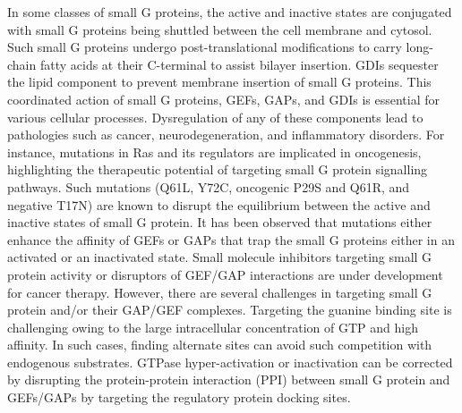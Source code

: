 \documentclass[12pt,a4paper]{achemso}
\begin{document}
In some classes of small G proteins, the active and inactive states are conjugated with small G proteins being shuttled between the cell membrane and cytosol. Such small G proteins undergo post-translational modifications to carry long-chain fatty acids at their C-terminal to assist bilayer insertion. GDIs\cite{dermardirossian2005gdis, maruta1998gtpase} sequester the lipid component to prevent membrane insertion of small G proteins. This coordinated action of small G proteins, GEFs, GAPs, and GDIs is essential for various cellular processes. Dysregulation of any of these components lead to pathologies such as cancer, neurodegeneration, and inflammatory disorders. For instance, mutations in Ras and its regulators are implicated in oncogenesis, highlighting the therapeutic potential of targeting small G protein signalling pathways\cite{cherfils2013regulation}. Such mutations (Q61L, Y72C, oncogenic P29S and Q61R, and negative T17N) are known to disrupt the equilibrium between the active and inactive states of small G protein\cite{rac1muts}. It has been observed that mutations either enhance the affinity of GEFs or GAPs that trap the small G proteins either in an activated or an inactivated state. Small molecule inhibitors targeting small G protein activity or disruptors of GEF/GAP interactions\cite{gray2020targeting} are under development for cancer therapy. However, there are several challenges in targeting small G protein and/or their GAP/GEF complexes. Targeting the guanine binding site is challenging owing to the large intracellular concentration of GTP and high affinity\cite{traut1994physiological}. In such cases, finding alternate sites can avoid such competition with endogenous substrates. GTPase hyper-activation or inactivation can be corrected by disrupting the protein-protein interaction (PPI) between small G protein and GEFs/GAPs by targeting the regulatory protein docking sites.   
\end{document}
